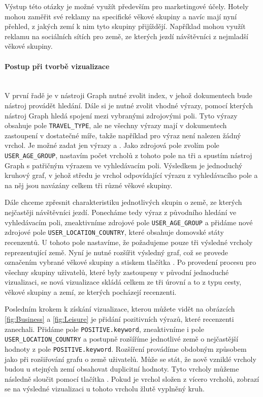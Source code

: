 \documentclass[czech,BP]{thesiskiv}
\begin{document}
Výstup této otázky je možné využít především pro marketingové účely. Hotely mohou zaměřit své reklamy na specifické věkové skupiny a navíc mají nyní přehled, z jakých zemí k nim tyto skupiny přijíždějí. Například mohou využít reklamu na sociálních sítích pro země, ze kterých jezdí návštěvníci z nejmladší věkové skupiny.

\paragraph{Postup při tvorbě vizualizace}
\mbox{}\\
V první řadě je v nástroji Graph nutné zvolit index, v jehož dokumentech bude nástroj provádět hledání. Dále si je nutné zvolit vhodné výrazy, pomocí kterých nástroj Graph hledá spojení mezi vybranými zdrojovými poli. Tyto výrazy obsahuje pole \texttt{TRAVEL\_TYPE}, ale ne všechny výrazy mají v dokumentech zastoupení v dostatečné míře, takže například pro výraz  není nalezen žádný vrchol. Je možné zadat jen výrazy  a . Jako zdrojová pole zvolím pole \texttt{USER\_AGE\_GROUP}, nastavím počet vrcholů z tohoto pole na tři a spustím nástroj Graph s patřičným výrazem ve vyhledávacím poli. Výsledkem je jednoduchý kruhový graf, v jehož středu je vrchol odpovídající výrazu z vyhledávacího pole a na něj jsou navázány celkem tři různé věkové skupiny.


Dále chceme zpřesnit charakteristiku jednotlivých skupin o země, ze kterých nejčastěji návštěvníci jezdí. Ponecháme tedy výraz z původního hledání ve vyhledávacím poli, zneaktivníme zdrojové pole \texttt{USER\_AGE\_GROUP} a přidáme nové zdrojové pole \texttt{USER\_LOCATION\_COUNTRY}, které obsahuje domovské státy recenzentů. U tohoto pole nastavíme, že požadujeme pouze tři výsledné vrcholy reprezentující země. Nyní je nutné rozšířit výsledný graf, což se provede označením vybrané věkové skupiny a stiskem tlačítka . Po provedení procesu  pro všechny skupiny uživatelů, které byly zastoupeny v původní jednoduché vizualizaci, se nová vizualizace skládá celkem ze tři úrovní a to z typu cesty, věkové skupiny a zemí, ze kterých pocházejí recenzenti.


Posledním krokem k získání vizualizace, kterou můžete vidět na obrázcích \ref{fig:Business} a \ref{fig:Leisure} je přidání pozitivních výrazů, které recenzenti zanechali. Přidáme pole \texttt{POSITIVE.key\-word}, zneaktivníme i pole \texttt{USER\_LOCATION\_COUN\-TRY} a postupně rozšíříme jednotlivé země o nejčastější hodnoty z pole \texttt{POSITIVE.key\-word}. Rozšíření provádíme obdobným způsobem jako při rozšiřování grafu o země uživatelů. Může se stát, že nově vzniklé vrcholy budou u stejných zemí obsahovat duplicitní hodnoty. Tyto vrcholy můžeme následně sloučit pomocí tlačítka . Pokud je vrchol složen z vícero vrcholů, zobrazí se na výsledné vizualizaci u tohoto vrcholu žlutě vyplněný kruh.
\end{document}
